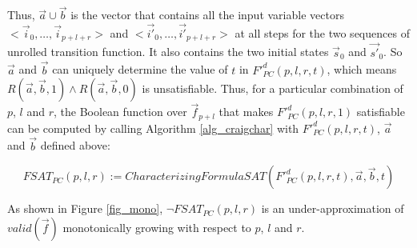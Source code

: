 \documentclass[runningheads,a4paper,orivec]{llncs}
\begin{document}
Thus,
$\vec{a}\cup\vec{b}$ is the vector that contains all the input variable vectors $<\vec{i}_0,\dots,\vec{i}_{p+l+r}>$ and $<\vec{i'}_0,\dots,\vec{i'}_{p+l+r}>$
at all steps for the two sequences of unrolled transition function.
It also contains the two initial states $\vec{s}_0$ and $\vec{s'}_0$.
So $\vec{a}$ and $\vec{b}$ can uniquely determine the value of $t$ in $F'^d_{PC}(p,l,r,t)$,
which means $R(\vec{a},\vec{b},1)\wedge R(\vec{a},\vec{b},0)$ is unsatisfiable.
Thus,
for a particular combination of $p$, $l$ and $r$,
the Boolean function over $\vec{f}_{p+l}$ that makes $F'^d_{PC}(p,l,r,1)$ satisfiable can be computed 
by calling Algorithm \ref{alg_craigchar} with $F'^d_{PC}(p,l,r,t)$, $\vec{a}$ and $\vec{b}$ defined above:

\begin{equation}\label{fsat_pc}
FSAT_{PC}(p,l,r):=CharacterizingFormulaSAT(F'^d_{PC}(p,l,r,t),\vec{a},\vec{b},t)
\end{equation}

% 
As shown in Figure \ref{fig_mono},
$\neg FSAT_{PC}(p,l,r)$ is an under-approximation of $valid(\vec{f})$ monotonically growing with respect to 
$p$, $l$ and $r$.
\end{document}
